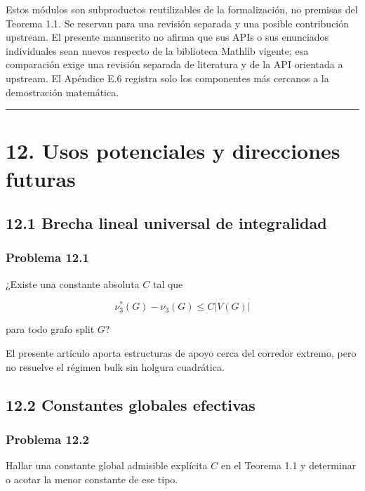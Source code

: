 \documentclass[
  spanish,
  11pt,
  a4paper,
]{article}
\begin{document}
Estos módulos son subproductos reutilizables de la formalización, no premisas del Teorema 1.1. Se reservan para una revisión separada y una posible contribución upstream. El presente manuscrito no afirma que sus APIs o sus enunciados individuales sean nuevos respecto de la biblioteca Mathlib vigente; esa comparación exige una revisión separada de literatura y de la API orientada a upstream. El Apéndice E.6 registra solo los componentes más cercanos a la demostración matemática.

\begin{center}\rule{0.5\linewidth}{0.5pt}\end{center}

\section{12. Usos potenciales y direcciones futuras}\label{usos-potenciales-y-direcciones-futuras}

\subsection{12.1 Brecha lineal universal de integralidad}\label{brecha-lineal-universal-de-integralidad}

\subsubsection{Problema 12.1}\label{problema-12.1}

¿Existe una constante absoluta \(C\) tal que

\[
\nu_3^*(G)-\nu_3(G)
\le C|V(G)|
\]

para todo grafo split \(G\)?

El presente artículo aporta estructuras de apoyo cerca del corredor extremo, pero no resuelve el régimen bulk sin holgura cuadrática.

\subsection{12.2 Constantes globales efectivas}\label{constantes-globales-efectivas}

\subsubsection{Problema 12.2}\label{problema-12.2}

Hallar una constante global admisible explícita \(C\) en el Teorema 1.1 y determinar o acotar la menor constante de ese tipo.
\end{document}
